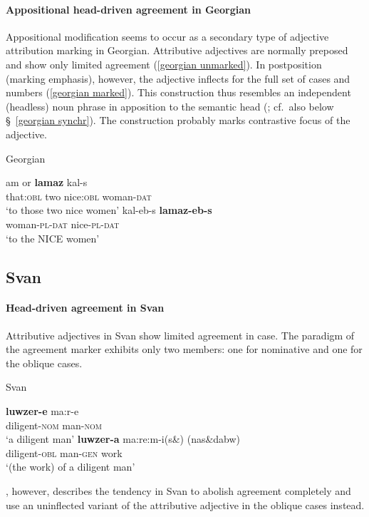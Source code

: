 \paragraph{Appositional head-driven agreement in Georgian}
Appositional modification seems to occur as a secondary type of adjective attribution marking in Georgian. Attributive adjectives are normally preposed and show only limited agreement (\ref{georgian unmarked}). In postposition (marking emphasis), however, the adjective inflects for the full set of cases and numbers (\ref{georgian marked}). This construction thus resembles an independent (headless) noun phrase in apposition to the semantic head (\citealt[652, 677]{testelec1998}; cf.~also below \S~\ref{georgian synchr}). The construction probably marks contrastive focus of the adjective.
\begin{exe}
\ex \rm{Georgian \citep[652]{testelec1998}}
\begin{xlist}
\label{georgian unmarked}
\ex 
\gll	am or \textbf{lamaz} kal-s\\
	that:\textsc{obl} two nice:\textsc{obl} woman-\textsc{dat}\\
\glt	‘to those two nice women’
\label{georgian marked}
\ex 
\gll	kal-eb-s \textbf{lamaz-eb-s}\\
	woman-\textsc{pl}-\textsc{dat} nice-\textsc{pl}-\textsc{dat}\\
\glt	‘to the NICE women’
\end{xlist}
\end{exe}

\subsection{Svan}
\paragraph{Head-driven agreement in Svan}
Attributive adjectives in Svan show limited agreement in case. The paradigm of the agreement marker exhibits only two members: one for nominative and one for the oblique cases.
\begin{exe}
\ex \rm{Svan \citep[18]{tuite1997}}
\begin{xlist}
\ex	
\gll 	\textbf{luwzer-e}	ma:r-e\\
	diligent-\textsc{nom} man-\textsc{nom}\\
\glt	‘a diligent man’
\ex	
\gll	\textbf{luwzer-a}	ma:re:m-i(s\&) (nas\&dabw)\\
	diligent-\textsc{obl} man-\textsc{gen} work\\
\glt	‘(the work) of a diligent man’
\end{xlist}
\end{exe}
\citet[499]{schmidt1991}, however, describes the tendency in Svan to abolish agreement completely and use an uninflected variant of the attributive adjective in the oblique cases instead.

